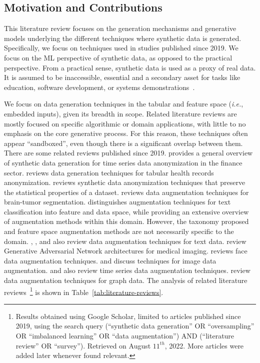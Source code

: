 \documentclass[parskip=full]{scrartcl}
\begin{document}

\subsection{Motivation and Contributions}

This literature review focuses on the generation mechanisms and generative
models underlying the different techniques where synthetic data is generated.
Specifically, we focus on techniques used in studies published since 2019. We
focus on the ML perspective of synthetic data, as opposed to the practical
perspective. From a practical sense, synthetic data is used as a proxy of real
data. It is assumed to be inaccessible, essential and a secondary asset for
tasks like education, software development, or systems
demonstrations~\cite{mannino2019real}. 

We focus on data generation techniques in the tabular and feature space
(\textit{i.e.}, embedded inputs), given its breadth in scope. Related
literature reviews are mostly focused on specific algorithmic or domain
applications, with little to no emphasis on the core generative process. For
this reason, these techniques often appear ``sandboxed'', even though there is
a significant overlap between them. There are some related reviews published
since 2019. \citet{assefa2020generating} provides a general overview of
synthetic data generation for time series data anonymization in the finance
sector. \citet{hernandez2022synthetic} reviews data generation techniques for
tabular health records anonymization. \citet{raghunathan2021synthetic} reviews
synthetic data anonymization techniques that preserve the statistical
properties of a dataset. \citet{nalepa2019data} reviews data augmentation
techniques for brain-tumor segmentation. \citet{bayer2021survey} distinguishes
augmentation techniques for text classification into feature and data space,
while providing an extensive overview of augmentation methods within this
domain. However, the taxonomy proposed and feature space augmentation methods
are not necessarily specific to the domain. \citet{shorten2021text},
\citet{chen2021empirical}, \citet{feng2021survey} and \citet{liu2020survey}
also review data augmentation techniques for text data.
\citet{yi2019generative} review Generative Adversarial Network architectures
for medical imaging. \citet{wang2020survey} reviews face data augmentation
techniques. \citet{shorten2019survey} and \citet{khosla2020enhancing} discuss
techniques for image data augmentation. \citet{iwana2021empirical} and
\citet{wen2020time} also review time series data augmentation techniques.
\citet{zhao2022graph} review data augmentation techniques for graph data. The
analysis of related literature reviews~\footnote{%
    Results obtained using Google Scholar, limited to articles published since
    2019, using the search query {\selectfont (``synthetic
    data generation'' OR ``oversampling'' OR ``imbalanced learning'' OR ``data
    augmentation'') AND (``literature review'' OR ``survey'')}. Retrieved on
    August $11^{th}$, 2022. More articles were added later whenever found
    relevant.
} is shown in Table~\ref{tab:literature-reviews}.
\end{document}
